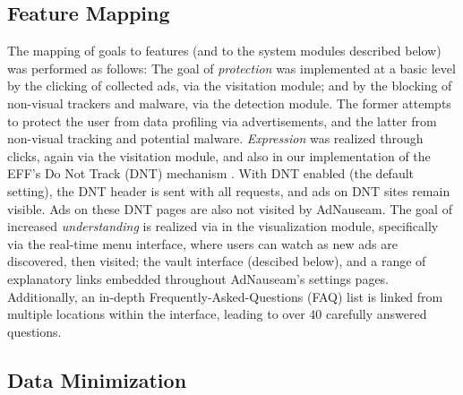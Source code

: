 \documentclass[conference]{IEEEtran}
\begin{document}
\subsection{Feature Mapping}

The mapping of goals to features (and to the system modules described below) was performed as follows: The goal of \emph{protection} was implemented at a basic level by the clicking of collected ads, via the visitation module; and by the blocking of non-visual trackers and malware, via the detection module. The former attempts to protect the user from data profiling via advertisements, and the latter from non-visual tracking and potential malware. \emph{Expression} was realized through clicks, again via the visitation module, and also in our implementation of the EFF's Do Not Track (DNT) mechanism \cite{EFF-1}. With DNT enabled (the default setting), the DNT header is sent with all requests, and ads on DNT sites remain visible. Ads on these DNT pages are also not visited by AdNauseam. The goal of increased \emph{understanding} is realized via in the visualization module, specifically via the real-time menu interface, where users can watch as new ads are discovered, then visited; the vault interface (descibed below), and a range of explanatory links embedded throughout AdNauseam's settings pages. Additionally, an in-depth Frequently-Asked-Questions (FAQ) list is linked from multiple locations within the interface, leading to over 40 carefully answered questions.


\subsection{Data Minimization}
\end{document}
